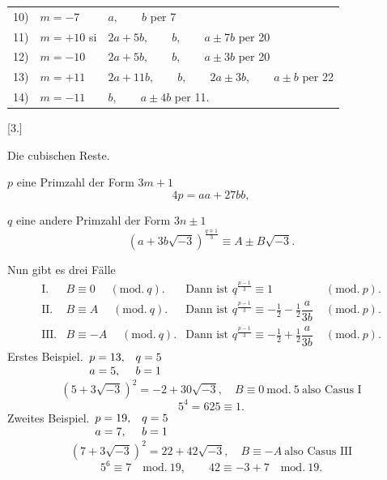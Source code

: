 \begin{center}\small\setlength{\tabcolsep}{3pt}\begin{tabular}{@{}rll@{}}
10)&$m=-7$&$a,\qquad b$ per 7\\
11)&$m=+10$ si&$2a+5b,\qquad b,\qquad a\pm7b$ per 20\\
12)&$m=-10$&$2a+5b,\qquad b,\qquad a\pm3b$ per 20\\
13)&$m=+11$&$2a+11b,\qquad b,\qquad2a\pm3b,\qquad a\pm b$ per 22\\
14)&$m=-11$&$b,\qquad a\pm4b$ per 11.
\end{tabular}\end{center}
\begin{center}[3.]\par\smallskip Die cubischen Reste.\end{center}
\noindent\hspace*{\parindent}$p$ eine Primzahl der Form $3m+1$
\[4p=aa+27bb,\]
\par\noindent\hspace*{\parindent}$q$ eine andere Primzahl der Form $3n\pm1$
\[(a+3b\sqrt{-3})^{\frac{q\mp1}{3}}\equiv A\pm B\sqrt{-3}.\]
\par\noindent\hspace*{\parindent}Nun gibt es drei Fälle
\[\begin{array}{rlll}
\text{I.}&B\equiv0\quad\;(\mathrm{mod.}\ q).&\text{Dann ist }q^{\frac{p-1}{3}}\equiv1&\;(\mathrm{mod.}\ p).\\[5pt]
\text{II.}&B\equiv A\quad\;(\mathrm{mod.}\ q).&\text{Dann ist }q^{\frac{p-1}{3}}\equiv-\tfrac12-\tfrac12\dfrac{a}{3b}&\;(\mathrm{mod.}\ p).\\[5pt]
\text{III.}&B\equiv-A\quad\;(\mathrm{mod.}\ q).&\text{Dann ist }q^{\frac{p-1}{3}}\equiv-\tfrac12+\tfrac12\dfrac{a}{3b}&\;(\mathrm{mod.}\ p).
\end{array}\]
\noindent\hspace*{\parindent}Erstes Beispiel.\qquad $\begin{array}[t]{ll}p=13,&q=5\\a=5,&b=1\end{array}$
\[(5+3\sqrt{-3})^2=-2+30\sqrt{-3},\quad B\equiv0\ \mathrm{mod.}\ 5\ \text{also Casus I}\]
\[5^4=625\equiv1.\]
\noindent\hspace*{\parindent}Zweites Beispiel.\qquad $\begin{array}[t]{ll}p=19,&q=5\\a=7,&b=1\end{array}$
\[(7+3\sqrt{-3})^2=22+42\sqrt{-3},\quad B\equiv-A\ \text{also Casus III}\]
\[5^6\equiv7\quad\mathrm{mod.}\ 19,\qquad42\equiv-3+7\quad\mathrm{mod.}\ 19.\]
